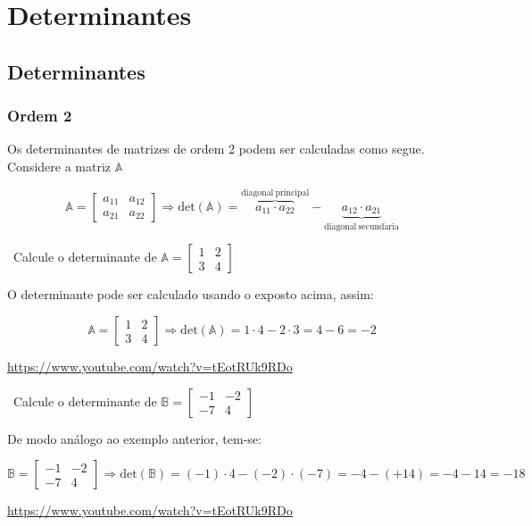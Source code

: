 
\chapter{Determinantes}
\section{Determinantes}

\subsection{Ordem 2}

Os determinantes de matrizes de ordem 2 podem ser calculadas como
segue. Considere a matriz $\mathbb{A}$

$$
\mathbb{A}=\begin{bmatrix}a_{11} & a_{12}\\
a_{21} & a_{22}
\end{bmatrix}\Rightarrow\mathrm{det(\mathbb{A})}=\overbrace{a_{11}\cdot a_{22}}^{\mathrm{diagonal\:principal}}-\underbrace{a_{12}\cdot a_{21}}_{\mathrm{diagonal\:secund\acute{a}ria}}
$$

\begin{example}
	\video \, Calcule o determinante de $\mathbb{A}=\begin{bmatrix}1 & 2\\
	3 & 4
	\end{bmatrix}$


	O determinante pode ser calculado usando o exposto acima, assim:
	
	$$
	\mathbb{A}=\begin{bmatrix}1 & 2\\
	3 & 4
	\end{bmatrix}\Rightarrow\mathrm{det(\mathbb{A})}=1\cdot4-2\cdot3=4-6=-2
	$$
	
	
\doutor \url{https://www.youtube.com/watch?v=tEotRUk9RDo}
\end{example}
\begin{example}
	\video \, Calcule o determinante de $\mathbb{B}=\begin{bmatrix}-1 & -2\\
	-7 & 4
	\end{bmatrix}$


	De modo análogo ao exemplo anterior, tem-se:
	
	$$
	\mathbb{B}=\begin{bmatrix}-1 & -2\\
	-7 & 4
	\end{bmatrix}\Rightarrow\mathrm{det(\mathbb{B})}=(-1)\cdot4-(-2)\cdot(-7)=-4-(+14)=-4-14=-18
	$$
	
	
\doutor \url{https://www.youtube.com/watch?v=tEotRUk9RDo}
\end{example}

